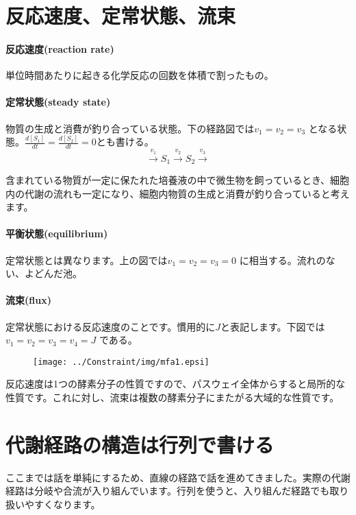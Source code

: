 \section{反応速度、定常状態、流束}


\paragraph{反応速度(reaction rate)}
単位時間あたりに起きる化学反応の回数を体積で割ったもの。

\paragraph{定常状態(steady state)}物質の生成と消費が釣り合っている状態。下の経路図では$v_1 = v_2 = v_3$ となる状態。\(\displaystyle \frac{d[S_1]}{dt}=\frac{d[S_2]}{dt}=0\)とも書ける。
\[\overset{v_1}\rightarrow S_1 \overset{v_2}\rightarrow S_2 \overset{v_3}\rightarrow \]

含まれている物質が一定に保たれた培養液の中で微生物を飼っているとき、細胞内の代謝の流れも一定になり、細胞内物質の生成と消費が釣り合っていると考えます。


\paragraph{平衡状態(equilibrium)}
定常状態とは異なります。上の図では$v_1 = v_2 = v_3 = 0$ に相当する。流れのない、よどんだ池。

\paragraph{流束(flux)}
定常状態における反応速度のことです。慣用的に\(J\)と表記します。下図では\(v_1 = v_2 = v_3 = v_4 = J\) である。
\begin{figure}[h]
\begin{center}
\texttt{[image: ../Constraint/img/mfa1.epsi]}
\end{center}
\end{figure}
反応速度は1つの酵素分子の性質ですので、パスウェイ全体からすると局所的な性質です。これに対し、流束は複数の酵素分子にまたがる大域的な性質です。\\


\section{代謝経路の構造は行列で書ける}
ここまでは話を単純にするため、直線の経路で話を進めてきました。実際の代謝経路は分岐や合流が入り組んでいます。行列を使うと、入り組んだ経路でも取り扱いやすくなります。

